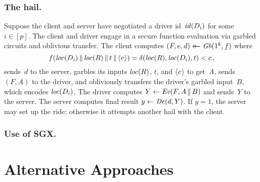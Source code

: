\documentclass{build/llncs}
\begin{document}
\subsubsection{The hail.}

Suppose the client and server have negotiated a driver id~$\mathit{id}(D_i)$ for
some~$i \in [p]$.
%
The client and driver engage in a secure function evaluation via garbled
circuits and oblivious transfer.
%
The client computes $(F, e, d) \mathrel{\leftarrow\mkern-14mu\leftarrow} \mathit{Gb}(1^k, f)$ where
\[
  f(\loc(D_i) \cat \loc(R)\cat t \cat \tostr(c)) =
    \delta(\loc(R), \loc(D_i), t) < c \,,
\]
sends~$d$ to the server, garbles its inputs $\mathit{loc}(R)$, $t$, and $\tostr(c)$ to get~$A$, sends~$(F, A)$ to the
driver, and obliviously transfers the driver's garbled input~$B$, which encodes
$\mathit{loc}(D_i)$.
%
The driver computes $Y \gets \mathit{Ev}(F, A \, \| \, B)$ and sends~$Y$ to the server. The
server computes final result $y \gets \mathit{De}(d, Y)$. If $y=1$, the server may set up
the ride; otherwise it attempts another hail with the client.

\subsubsection{Use of SGX.}



\section*{Alternative Approaches}
\end{document}
